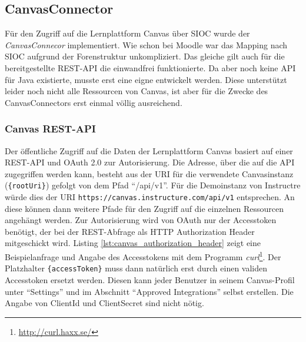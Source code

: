 

\subsection{CanvasConnector} %
\label{sub:canvas_connector}

Für den Zugriff auf die Lernplattform Canvas über SIOC wurde der \emph{CanvasConnecor} implementiert. Wie schon bei Moodle war das Mapping nach SIOC aufgrund der Forenstruktur unkompliziert. Das gleiche gilt auch für die bereitgestellte REST-API die einwandfrei funktionierte. Da aber noch keine API für Java existierte, musste erst eine eigne entwickelt werden. Diese unterstützt leider noch nicht alle Ressourcen von Canvas, ist aber für die Zwecke des CanvasConnectors erst einmal völlig ausreichend. 


\subsubsection{Canvas REST-API} %
\label{ssub:canvas_api}

Der öffentliche Zugriff auf die Daten der Lernplattform Canvas basiert auf einer REST-API und OAuth 2.0 zur Autorisierung. Die Adresse, über die auf die API zugegriffen werden kann, besteht aus der URI für die verwendete Canvasinstanz (\texttt{\{rootUri\}}) gefolgt von dem Pfad \enquote{/api/v1}. Für die Demoinstanz von Instructre würde dies der URI \texttt{https://canvas.instructure.com/api/v1} entsprechen. An diese können dann weitere Pfade für den Zugriff auf die einzelnen Ressourcen angehängt werden. Zur Autorisierung wird von OAuth nur der Accesstoken benötigt, der bei der REST-Abfrage als HTTP Authorization Header mitgeschickt wird. Listing \ref{lst:canvas_authorization_header} zeigt eine Beispielanfrage und Angabe des Accesstokens mit dem Programm \emph{curl}\footnote{\url{http://curl.haxx.se/}}. Der Platzhalter \texttt{\{accessToken\}} muss dann natürlich erst durch einen validen Accesstoken ersetzt werden. Diesen kann jeder Benutzer in seinem Canvas-Profil unter \enquote{Settings} und im Abschnitt \enquote{Approved Integrations} selbst erstellen. Die Angabe von ClientId und ClientSecret sind nicht nötig.


